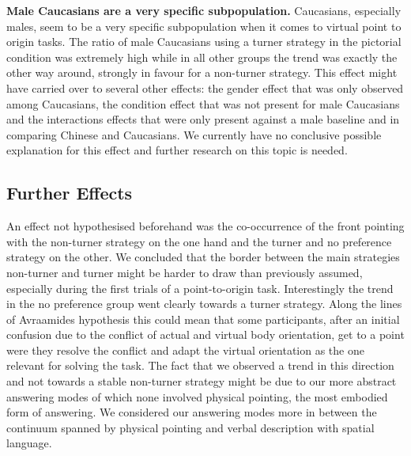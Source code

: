 \documentclass{frontiersSCNS} %
\begin{document}
\textbf{Male Caucasians are a very specific subpopulation.}
Caucasians, especially males, seem to be a very specific subpopulation when it comes to virtual point to origin tasks. The ratio of male Caucasians using a turner strategy in the pictorial condition was extremely high while in all other groups the trend was exactly the other way around, strongly in favour for a non-turner strategy. This effect might have carried over to several other effects: the gender effect that was only observed among Caucasians, the condition effect that was not present for male Caucasians and the interactions effects that were only present against a male baseline and in comparing Chinese and Caucasians.  We currently have no conclusive possible explanation for this effect and further research on this topic is needed.\\

\subsection{Further Effects}
An effect not hypothesised beforehand was the co-occurrence of the front pointing with the non-turner strategy on the one hand and the turner and no preference strategy on the other. We concluded that the border between the main strategies non-turner and turner might be harder to draw than previously assumed, especially during the first trials of a point-to-origin task. Interestingly the trend in the no preference group went clearly towards a turner strategy. Along the lines of Avraamides hypothesis this could mean that some participants, after an initial confusion due to the conflict of actual and virtual body orientation, get to a point were they resolve the conflict and adapt the virtual orientation as the one relevant for solving the task. The fact that we observed a trend in this direction and not towards a stable non-turner strategy might be due to our more abstract answering modes of which none involved physical pointing, the most embodied form of answering. We considered our answering modes more in between the continuum spanned by physical pointing and verbal description with spatial language.
\end{document}
